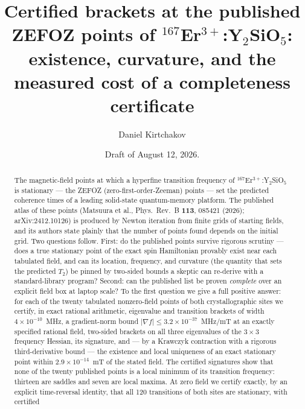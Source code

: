 \documentclass[11pt]{amsart}
\theoremstyle{plain}
\theoremstyle{definition}
\theoremstyle{remark}
\begin{document}
\title[Certified brackets at the ZEFOZ points of
$^{167}$Er$^{3+}$:Y$_2$SiO$_5$]{Certified brackets at the published ZEFOZ
points of $^{167}$Er$^{3+}$:Y$_2$SiO$_5$: existence, curvature, and the
measured cost of a completeness certificate}

\author{Daniel Kirtchakov}
\address{Independent researcher (\texttt{05oz}), Half Ounce Research; no
institutional affiliation. ORCID 0009-0009-5213-4098.
\texttt{daniel@halfounce.io} $\cdot$ \texttt{https://halfounce.io}}

\date{Draft of August 12, 2026.}

\begin{abstract}
The magnetic-field points at which a hyperfine transition frequency of
$^{167}$Er$^{3+}$:Y$_2$SiO$_5$ is stationary --- the ZEFOZ
(zero-first-order-Zeeman) points --- set the predicted coherence times of a
leading solid-state quantum-memory platform.  The published atlas of these
points (Matsuura et al., Phys.\ Rev.\ B \textbf{113}, 085421 (2026);
arXiv:2412.10126) is produced by Newton iteration from finite grids of starting
fields, and its authors state plainly that the number of points found depends
on the initial grid.  Two questions follow.  First: do the published points
survive rigorous scrutiny --- does a true stationary point of the exact spin
Hamiltonian provably exist near each tabulated field, and can its location,
frequency, and curvature (the quantity that sets the predicted $T_2$) be pinned
by two-sided bounds a skeptic can re-derive with a standard-library program?
Second: can the published list be proven \emph{complete} over an explicit field
box at laptop scale?  To the first question we give a full positive answer: for
each of the twenty tabulated nonzero-field points of both crystallographic
sites we certify, in exact rational arithmetic, eigenvalue and transition
brackets of width $4\times10^{-10}$~MHz, a gradient-norm bound
$|\nabla f|\le 3.2\times10^{-37}$~MHz/mT at an exactly specified rational
field, two-sided brackets on all three eigenvalues of the $3\times3$ frequency
Hessian, its signature, and --- by a Krawczyk contraction with a rigorous
third-derivative bound --- the existence and local uniqueness of an exact
stationary point within $2.9\times10^{-14}$~mT of the stated field.  The
certified signatures show that none of the twenty published points is a local
minimum of its transition frequency: thirteen are saddles and seven are local
maxima.  At zero field we certify exactly, by an explicit time-reversal
identity, that all 120 transitions of both sites are stationary, with certified

\end{abstract}
\end{document}
